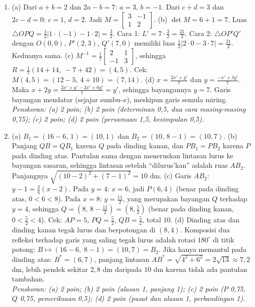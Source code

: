 \documentclass[a4paper,11pt]{article}
\begin{document}
\begin{enumerate}[leftmargin=2em,itemsep=3pt,topsep=2pt]
\item[\textbf{4.}] (a) Dari $a+b=2$ dan $2a-b=7$: $a=3$, $b=-1$. Dari $c+d=3$ dan $2c-d=0$: $c=1$, $d=2$. Jadi $M=\begin{bmatrix}3&-1\\1&2\end{bmatrix}$. (b) $\det M=6+1=7$. Luas $\triangle OPQ=\frac12|1\cdot(-1)-1\cdot2|=\frac32$. Cara 1: $L'=7\cdot\frac32=\frac{21}{2}$. Cara 2: $\triangle OP'Q'$ dengan $O(0,0)$, $P'(2,3)$, $Q'(7,0)$ memiliki luas $\frac12|2\cdot0-3\cdot7|=\frac{21}{2}$. Keduanya sama. (c) $M^{-1}=\frac17\begin{bmatrix}2&1\\-1&3\end{bmatrix}$, sehingga $R=\frac17(14+14,\;-7+42)=(4,5)$. Cek: $M(4,5)=(12-5,\,4+10)=(7,14)$. (d) $x=\frac{2x'+y'}{7}$ dan $y=\frac{-x'+3y'}{7}$. Maka $x+2y=\frac{2x'+y'-2x'+6y'}{7}=y'$, sehingga bayangannya $y=7$. Garis bayangan mendatar (sejajar sumbu-$x$), meskipun garis semula miring. \\ \textit{Penskoran: (a) 2 poin; (b) 2 poin (determinan 0,5, dua cara masing-masing 0,75); (c) 2 poin; (d) 2 poin (persamaan 1,5, kesimpulan 0,5).}
\item[\textbf{5.}] (a) $B_1=(16-6,\,1)=(10,1)$ dan $B_2=(10,\,8-1)=(10,7)$. (b) Panjang $QB=QB_1$ karena $Q$ pada dinding kanan, dan $PB_1=PB_2$ karena $P$ pada dinding atas. Pantulan sama dengan meneruskan lintasan lurus ke bayangan sasaran, sehingga lintasan setelah ``dilurus'kan'' adalah ruas $AB_2$. Panjangnya $\sqrt{(10-2)^2+(7-1)^2}=10$ dm. (c) Garis $AB_2$: $y-1=\frac34(x-2)$. Pada $y=4$: $x=6$, jadi $P(6,4)$ (benar pada dinding atas, $0<6<8$). Pada $x=8$: $y=\frac{11}{2}$, yang merupakan bayangan $Q$ terhadap $y=4$, sehingga $Q=\left(8,\,8-\frac{11}{2}\right)=\left(8,\frac52\right)$ (benar pada dinding kanan, $0<\frac52<4$). Cek: $AP=5$, $PQ=\frac52$, $QB=\frac52$, total $10$. (d) Dinding atas dan dinding kanan tegak lurus dan berpotongan di $(8,4)$. Komposisi dua refleksi terhadap garis yang saling tegak lurus adalah rotasi $180^\circ$ di titik potong: $B\mapsto(16-6,\;8-1)=(10,7)=B_2$. Jika hanya memantul pada dinding atas: $B^*=(6,7)$, panjang lintasan $AB^*=\sqrt{4^2+6^2}=2\sqrt{13}\approx7{,}2$ dm, lebih pendek sekitar $2{,}8$ dm daripada $10$ dm karena tidak ada pantulan tambahan. \\ \textit{Penskoran: (a) 2 poin; (b) 2 poin (alasan 1, panjang 1); (c) 2 poin ($P$ 0,75, $Q$ 0,75, pemeriksaan 0,5); (d) 2 poin (pusat dan alasan 1, perbandingan 1).}
\end{enumerate}
\end{document}
